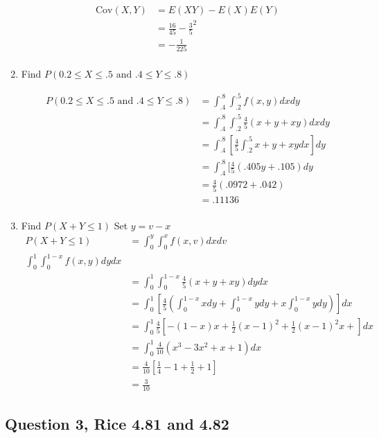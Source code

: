 \documentclass{tufte-book}
\newcommand{\Cov}{\mathrm{Cov}}
\theoremstyle{mytheoremstyle}
\theoremstyle{mylemstyle}
\theoremstyle{mydefstyle}
\begin{document}
\begin{enumerate}
\begin{align*}
\Cov(X,Y) &= E(XY) - E(X)E(Y)\\
&= \frac{16}{45} - \frac{3}{5}^2\\
&= -\frac{1}{225}\\
\end{align*}

\item Find $P(0.2 \leq X \leq .5 \text{ and } .4 \leq Y \leq .8)$

\begin{align*}
P(0.2 \leq X \leq .5 \text{ and } .4 \leq Y \leq .8) &= \int_{.4}^{.8} \int_{.2}^{.5} f(x,y)dxdy\\
&= \int_{.4}^{.8} \int_{.2}^{.5} \frac{4}{5}(x + y + xy)dxdy\\
&= \int_{.4}^{.8}[\frac{4}{5} \int_{.2}^{.5} x+y+xy dx]dy\\
&= \int_{.4}^{.8}[\frac{4}{5}(.405y  + .105)dy\\
&= \frac{4}{5}(.0972 + .042)\\
&= .11136\\
\end{align*}
\item Find $P(X + Y \leq 1)$
Set $y=v-x$
\begin{align*}
P(X + Y \leq 1) &= \int_0^y \int_0^xf(x,v)dxdv\\
\int_0^1 \int_0^{1-x} f(x,y)dydx\\
&= \int_0^1 \int_0^{1-x} \frac{4}{5}(x+y+xy)dydx\\
&= \int_0^1[\frac{4}{5}(\int_0^{1-x}xdy + \int_0^{1-x}ydy + x\int_0^{1-x}ydy)]dx\\
&=\int_0^1 \frac{4}{5}[-(1-x)x + \frac{1}{2}(x-1)^2+ \frac{1}{2}(x-1)^2x +]dx\\
&=\int_0^1 \frac{4}{10}(x^3 - 3x^2 + x +1)dx\\
&= \frac{4}{10}[\frac{1}{4} - 1 + \frac{1}{2} +1]\\
&= \frac{3}{10}
\end{align*}
\end{enumerate}


\subsection{Question 3, Rice 4.81 and 4.82}
\end{document}

